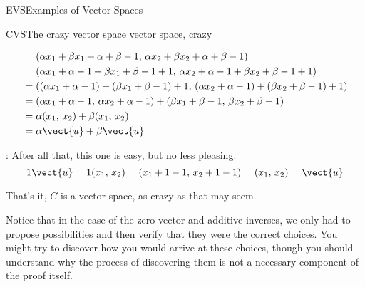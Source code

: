\begin{subsect}{EVS}{Examples of Vector Spaces}
\begin{example}{CVS}{The crazy vector space }{vector space, crazy}
\begin{para}
\begin{align*}
&=(\alpha x_1+\beta x_1+\alpha+\beta-1,\,\alpha x_2+\beta x_2+\alpha+\beta-1)\\
&=(\alpha x_1+\alpha-1+\beta x_1+\beta-1+1,\,\alpha x_2+\alpha-1+\beta x_2+\beta-1+1)\\
&=((\alpha x_1+\alpha-1)+(\beta x_1+\beta-1)+1,\,(\alpha x_2+\alpha-1)+(\beta x_2+\beta-1)+1)\\
&=(\alpha x_1+\alpha-1,\,\alpha x_2+\alpha-1)+(\beta x_1+\beta-1,\,\beta x_2+\beta-1)\\
&=\alpha(x_1,\,x_2)+\beta(x_1,\,x_2)\\
&=\alpha\vect{u}+\beta\vect{u}
\end{align*}
\end{para}
%
\begin{para}:  After all that, this one is easy, but no less pleasing.
%
\begin{equation*}
1\vect{u}=1(x_1,\,x_2)=(x_1+1-1,\,x_2+1-1)=(x_1,\,x_2)=\vect{u}
\end{equation*}
\end{para}
%
\begin{para}That's it, $C$ is a vector space, as crazy as that may seem.\end{para}
%
\begin{para}Notice that in the case of the zero vector and additive inverses, we only had to propose possibilities and then verify that they were the correct choices.  You might try to discover how you would arrive at these choices, though you should understand why the process of discovering them is not a necessary component of the proof itself.\end{para}
\end{example}
%
\end{subsect}
%
